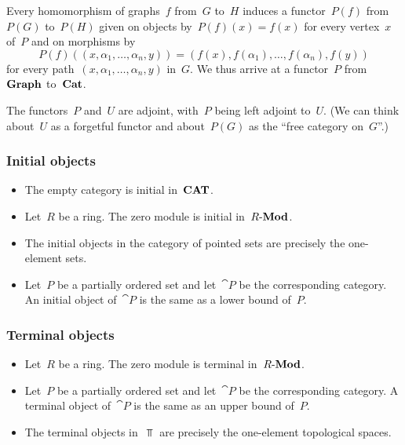 \begin{itemize}
		Every homomorphism of graphs~$f$ from~$G$ to~$H$ induces a functor~$P(f)$ from~$P(G)$ to~$P(H)$ given on objects by~$P(f)(x) = f(x)$ for every vertex~$x$ of~$P$ and on morphisms by
		\[
			P(f)( (x, α_1, \dotsc, α_n, y) )
			=
			( f(x), f(α_1), \dotsc, f(α_n), f(y) )
		\]
		for every path~$(x, α_1, \dotsc, α_n, y)$ in~$G$.
		We thus arrive at a functor~$P$ from~$\mathbf{Graph}$ to~$\mathbf{Cat}$.

		The functors~$P$ and~$U$ are adjoint, with~$P$ being left adjoint to~$U$.
		(We can think about~$U$ as a forgetful functor and about~$P(G)$ as the \enquote{free category on~$G$}.)
\end{itemize}



\subsubsection*{Initial objects}

\begin{itemize}
	\item
		The empty category is initial in~$\mathbf{CAT}$.
	\item
		Let~$R$ be a ring.
		The zero module is initial in~$R\text{-}\mathbf{Mod}$.
	\item
		The initial objects in the category of pointed sets are precisely the one-element sets.
	\item
		Let~$P$ be a partially ordered set and let~$\cat{P}$ be the corresponding category.
		An initial object of~$\cat{P}$ is the same as a lower bound of~$P$.
\end{itemize}



\subsubsection*{Terminal objects}

\begin{itemize}
	\item
		Let~$R$ be a ring.
		The zero module is terminal in~$R\text{-}\mathbf{Mod}$.
	\item
		Let~$P$ be a partially ordered set and let~$\cat{P}$ be the corresponding category.
		A terminal object of~$\cat{P}$ is the same as an upper bound of~$P$.
	\item
		The terminal objects in~$\Top$ are precisely the one-element topological spaces.
\end{itemize}
